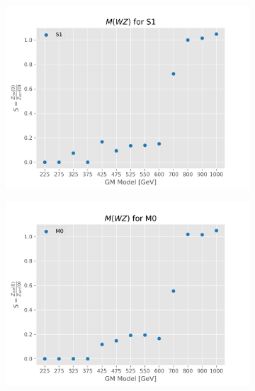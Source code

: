 \documentclass[../Bachelorarbeit.tex]{subfiles}
\begin{document}
\begin{figure}[h]
    \centering
    \begin{subfigure}{0.45\textwidth}
        \includegraphics[width=\textwidth]{Plots/gm_relevanze/MWZ_op_S1.png}
    \end{subfigure}
    \begin{subfigure}{0.45\textwidth}
        \includegraphics[width=\textwidth]{Plots/gm_relevanze/MWZ_op_M0.png}
    \end{subfigure}
    \begin{subfigure}{0.45\textwidth}

\end{subfigure}
\end{figure}
\end{document}
